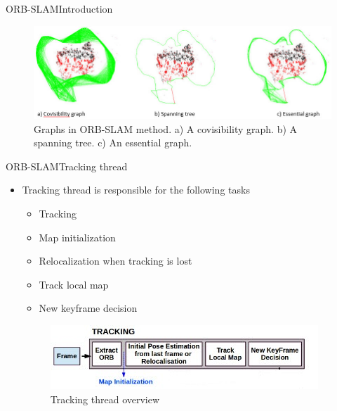 \documentclass[aspectratio=169]{beamer}
\begin{document}
\begin{frame}{ORB-SLAM}{Introduction}
    \begin{figure}
\includegraphics[scale=0.4]{figs/Graphs}
\caption{Graphs in ORB-SLAM method. a) A covisibility graph. b) A spanning tree. c) An essential graph.}
\end{figure}
  
\end{frame}

\begin{frame}{ORB-SLAM}{Tracking thread}
  \begin{itemize}
      \item{
      Tracking thread is responsible for the following tasks
      \begin{itemize}
          \item{
          Tracking       
          }
          \item{
          Map initialization
          }
          \item{
          Relocalization when tracking is lost
          }
          \item{
          Track local map
          }
          \item{
          New keyframe decision
          }
      \end{itemize}
      }
      \begin{figure}
          \centering
          \includegraphics[scale=0.9]{figs/Tracking}
          \caption{Tracking thread overview}
      \end{figure}
      
  \end{itemize}
\end{frame}
\end{document}
